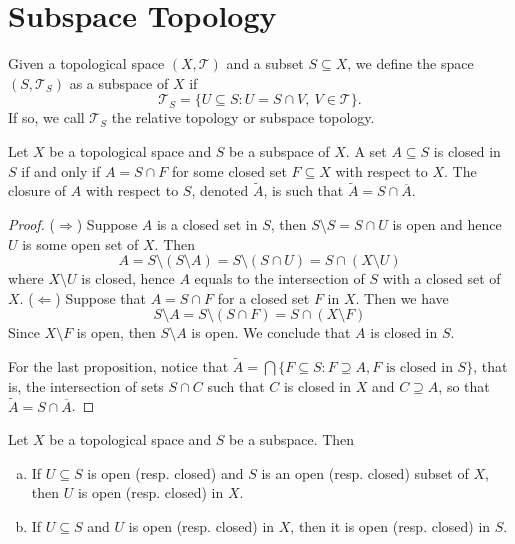 \section{Subspace Topology}

\begin{definition}
  \label{def: subspace topology}
  Given a topological space \((X, \mathcal T)\) and a subset \(S \subseteq X\),
  we define the space \((S, \mathcal T_S)\) as a subspace of \(X\) if
  \[
    \mathcal T_S = \{U \subseteq S: U = S \cap V,\ V \in \mathcal T\}.
  \]
  If so, we call \(\mathcal T_S\) the relative topology or subspace topology.
\end{definition}

\begin{proposition}\label{prop: closed in subspace}
  Let \(X\) be a topological space and \(S\) be a subspace of \(X\). A set \(A
  \subseteq S\) is closed in \(S\) if and only if \(A = S \cap F\) for some
  closed set \(F \subseteq X\) with respect to \(X\). The closure of \(A\) with
  respect to \(S\), denoted \(\widetilde A\), is such that \(\widetilde A = S
  \cap \overline A\).
\end{proposition}

\begin{proof}
  (\(\Rightarrow\)) Suppose \(A\) is a closed set in \(S\), then \(S \setminus
  S = S \cap U\) is open and hence \(U\) is some open set of \(X\). Then
  \[
    A = S \setminus (S \setminus A) = S \setminus (S \cap U)
    = S \cap (X \setminus U)
  \]
  where \(X \setminus U\) is closed, hence \(A\) equals to the intersection of
  \(S\) with a closed set of \(X\).
  (\(\Leftarrow\)) Suppose that \(A = S \cap F\) for a closed set \(F\) in
  \(X\). Then we have
  \[
    S \setminus A = S \setminus (S \cap F) = S \cap (X \setminus F)
  \]
  Since \(X\setminus F\) is open, then \(S \setminus A\) is open. We conclude
  that \(A\) is closed in \(S\).

  For the last proposition, notice that \(\widetilde A = \bigcap \{F \subseteq S
  : F \supseteq A, F \text{ is closed in } S\}\), that is, the intersection of
  sets \(S \cap C\) such that \(C\) is closed in \(X\) and \(C \supseteq A\), so
  that \(\widetilde A = S \cap \overline A\).
\end{proof}

\begin{proposition}\label{prop: relative open to open}
  Let \(X\) be a topological space and \(S\) be a subspace. Then
  \begin{enumerate}[(a)]
    \item If \(U \subseteq S\) is open (resp. closed) and \(S\) is an open
      (resp. closed) subset of \(X\), then \(U\) is open (resp. closed) in
      \(X\).
    \item If \(U \subseteq S\) and \(U\) is open (resp. closed) in \(X\), then
      it is open (resp. closed) in \(S\).
  \end{enumerate}
\end{proposition}

